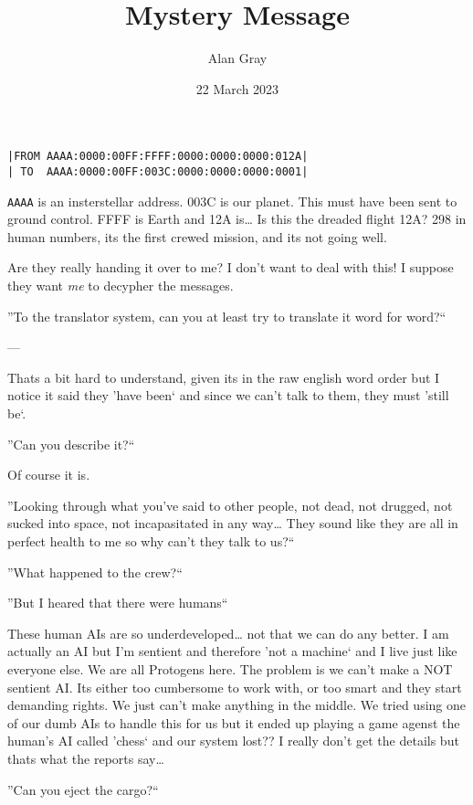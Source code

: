 \documentclass{article}
\title{Mystery Message}
\author{Alan Gray}
\date{22 March 2023}
\begin{document}
\maketitle
\thispagestyle{fancy}
\begin{center}\begin{verbatim}
|FROM AAAA:0000:00FF:FFFF:0000:0000:0000:012A|
| TO  AAAA:0000:00FF:003C:0000:0000:0000:0001|
\end{verbatim}\end{center}

\verb|AAAA| is an insterstellar address. 003C is our planet. This must have been
sent to ground control. FFFF is Earth and 12A is\ldots{} Is this the dreaded 
flight 12A? 298 in human numbers, its the first crewed mission, and its not 
going well.

Are they really handing it over to me? I don't want to deal with this! I suppose
they want \textit{me} to decypher the messages.


''To the translator system, can you at least try to translate it word for word?``

 --- 

Thats a bit hard to understand, given its in the raw english word order but I
notice it said they 'have been` and since we can't talk to them, they must
'still be`.

''Can you describe it?``


Of course it is.

''Looking through what you've said to other people, not dead, not drugged, not
sucked into space, not incapasitated in any way\ldots{} They sound like they are
all in perfect health to me so why can't they talk to us?``


''What happened to the crew?``


''But I heared that there were humans``


These human AIs are so underdeveloped\ldots{} not that we can do any better.
I am actually an AI but I'm sentient and therefore 'not a machine` and I live 
just like everyone else. We are all Protogens here. The problem is we can't make
a NOT sentient AI. Its either too cumbersome to work with, or too smart and they
start demanding rights. We just can't make anything in the middle. We tried
using one of our dumb AIs to handle this for us but it ended up playing a game
agenst the human's AI called 'chess` and our system lost?? I really don't get
the details but thats what the reports say\ldots

''Can you eject the cargo?``
\end{document}
